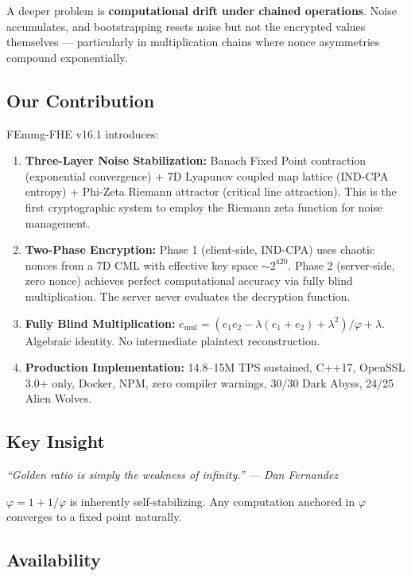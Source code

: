 \documentclass{article}
\begin{document}
A deeper problem is \textbf{computational drift under chained operations}. Noise accumulates, and bootstrapping resets noise but not the encrypted values themselves — particularly in multiplication chains where nonce asymmetries compound exponentially.

\subsection{Our Contribution}

FEmmg-FHE v16.1 introduces:

\begin{enumerate}
    \item \textbf{Three-Layer Noise Stabilization:} Banach Fixed Point contraction (exponential convergence) + 7D Lyapunov coupled map lattice (IND-CPA entropy) + Phi-Zeta Riemann attractor (critical line attraction). This is the first cryptographic system to employ the Riemann zeta function for noise management.
    
    \item \textbf{Two-Phase Encryption:} Phase 1 (client-side, IND-CPA) uses chaotic nonces from a 7D CML with effective key space $\sim 2^{420}$. Phase 2 (server-side, zero nonce) achieves perfect computational accuracy via fully blind multiplication. The server never evaluates the decryption function.
    
    \item \textbf{Fully Blind Multiplication:} $e_{\text{mul}} = (e_1 e_2 - \lambda(e_1 + e_2) + \lambda^2)/\varphi + \lambda$. Algebraic identity. No intermediate plaintext reconstruction.
    
    \item \textbf{Production Implementation:} 14.8--15M TPS sustained, C++17, OpenSSL 3.0+ only, Docker, NPM, zero compiler warnings, 30/30 Dark Abyss, 24/25 Alien Wolves.
\end{enumerate}

\subsection{Key Insight}

\textit{``Golden ratio is simply the weakness of infinity.'' — Dan Fernandez}

$\varphi = 1 + 1/\varphi$ is inherently self-stabilizing. Any computation anchored in $\varphi$ converges to a fixed point naturally.

\subsection{Availability}
\end{document}
